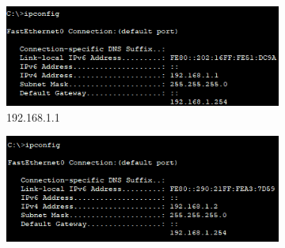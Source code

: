 \begin{figure}[!htb]
    \centering
    \begin{subfigure}{.49\textwidth}
        \includegraphics[width=\textwidth,height=.85\textwidth,keepaspectratio]{./img/ip1.png}
        \caption{192.168.1.1}
    \end{subfigure}
    \begin{subfigure}{.49\textwidth}
        \includegraphics[width=\textwidth,height=.85\textwidth,keepaspectratio]{./img/ip2.png}

\end{subfigure}
\end{figure}
